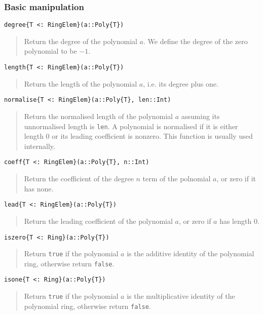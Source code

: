 \documentclass[a4paper,10pt]{article}
\newcommand{\code}{\lstinline}
\newcommand{\desc}[1]{\vspace{-3mm}\begin{quote}#1\end{quote}}
\begin{document}
\subsubsection{Basic manipulation}

\begin{lstlisting}
degree{T <: RingElem}(a::Poly{T})
\end{lstlisting}

\desc{Return the degree of the polynomial $a$. We define the degree of the zero
polynomial to be $-1$.}

\begin{lstlisting}
length{T <: RingElem}(a::Poly{T})
\end{lstlisting}

\desc{Return the length of the polynomial $a$, i.e. its degree plus one.}

\begin{lstlisting}
normalise{T <: RingElem}(a::Poly{T}, len::Int)
\end{lstlisting}

\desc{Return the normalised length of the polynomial $a$ assuming its unnormalised
length is \code{len}. A polynomial is normalised if it is either length $0$ or its
leading coefficient is nonzero. This function is usually used internally.}

\begin{lstlisting}
coeff{T <: RingElem}(a::Poly{T}, n::Int)
\end{lstlisting}

\desc{Return the coefficient of the degree $n$ term of the polnomial $a$, or zero
if it has none.}

\begin{lstlisting}
lead{T <: RingElem}(a::Poly{T})
\end{lstlisting}

\desc{Return the leading coefficient of the polynomial $a$, or zero if $a$ has
length $0$.}

\begin{lstlisting}
iszero{T <: Ring}(a::Poly{T})
\end{lstlisting}

\desc{Return \code{true} if the polynomial $a$ is the additive identity of the
polynomial ring, otherwise return \code{false}.}

\begin{lstlisting}
isone{T <: Ring}(a::Poly{T})
\end{lstlisting}

\desc{Return \code{true} if the polynomial $a$ is the multiplicative identity
of the polynomial ring, otherwise return \code{false}.}
\end{document}
